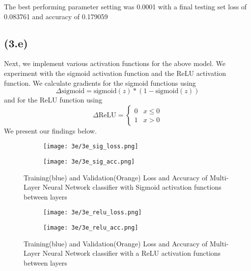 \documentclass{article} %
\begin{document}
The best performing parameter setting was 0.0001 with a final testing set loss of 0.083761 and accuracy of 0.179059

\subsection{ (3.e)}
Next, we implement various activation functions for the above model. We experiment with the sigmoid activation function and the ReLU activation function. We calculate gradients for the sigmoid functions using $$\Delta \text{sigmoid} = \text{sigmoid}(z)*(1-\text{sigmoid}(z))$$ and for the ReLU function using $$\Delta \text{ReLU} = \begin{cases} 
      0 & x\leq 0 \\
      1 & x > 0 
  \end{cases}
$$ We present our findings below. 

\begin{figure}[H]
\centering
\begin{subfigure}{.5\textwidth}
  \centering
  \texttt{[image: 3e/3e\_sig\_loss.png]}
  \label{fig:sub1}
\end{subfigure}%
\begin{subfigure}{.5\textwidth}
  \centering
\texttt{[image: 3e/3e\_sig\_acc.png]}
  \label{fig:sub2}
\end{subfigure}
\caption{Training(blue) and Validation(Orange) Loss and Accuracy of Multi-Layer Neural Network classifier with Sigmoid activation functions between layers}
\label{fig:test}
\end{figure}

\begin{figure}[H]
\centering
\begin{subfigure}{.5\textwidth}
  \centering
  \texttt{[image: 3e/3e\_relu\_loss.png]}  \label{fig:sub1}
\end{subfigure}%
\begin{subfigure}{.5\textwidth}
  \centering
\texttt{[image: 3e/3e\_relu\_acc.png]}
  \label{fig:sub2}
\end{subfigure}
\caption{Training(blue) and Validation(Orange) Loss and Accuracy of Multi-Layer Neural Network classifier with a ReLU activation functions between layers}
\label{fig:test}
\end{figure}
\end{document}
